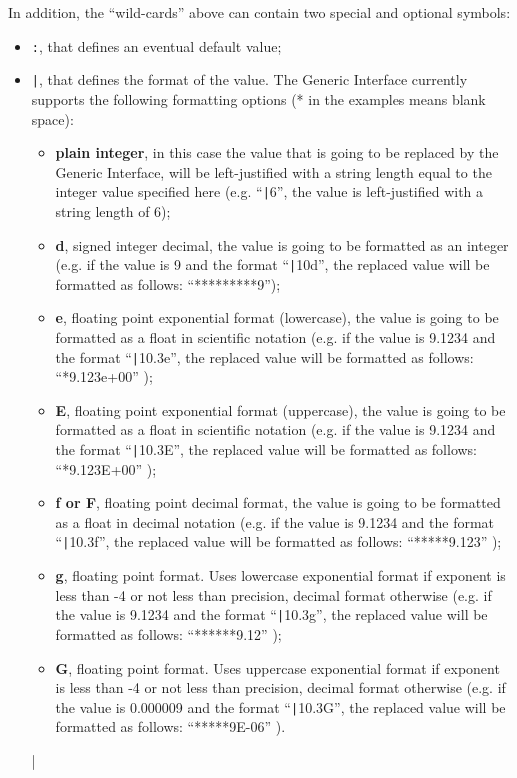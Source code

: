 In addition, the ``wild-cards'' above can contain two special and optional symbols:
\begin{itemize}
  \item  \texttt{:}, that defines an eventual default value;
  \item  \texttt{|}, that defines the format of the value. The  Generic Interface currently supports the following formatting options (* in the examples means blank space):
    \begin{itemize}
       \item \textbf{plain integer}, in this case  the value that is going to be replaced by the Generic Interface, will be left-justified with a string length equal to the integer value specified here (e.g. ``\texttt{|}6'', the value is left-justified with a string length of 6);
      \item \textbf{d}, signed integer decimal, the value is going to be formatted as an integer (e.g.  if the value is 9 and the format ``\texttt{|}10d'', the replaced value will be formatted as follows: ``*********9'');
      \item \textbf{e}, floating point exponential format (lowercase), the value is going to be formatted as a float in scientific notation (e.g. if the value is 9.1234 and the format ``\texttt{|}10.3e'', the replaced value will be formatted as follows: ``*9.123e+00'' );
      \item \textbf{E}, floating point exponential format (uppercase), the value is going to be formatted as a float in scientific notation (e.g. if the value is 9.1234 and the format ``\texttt{|}10.3E'', the replaced value will be formatted as follows: ``*9.123E+00'' );
      \item \textbf{f or F}, floating point decimal format, the value is going to be formatted as a float in decimal notation (e.g. if the value is 9.1234 and the format ``\texttt{|}10.3f'', the replaced value will be formatted as follows: ``*****9.123'' );
      \item \textbf{g}, floating point format. Uses lowercase exponential format if exponent is less than -4 or not less than precision, decimal format otherwise (e.g. if the value is 9.1234 and the format ``\texttt{|}10.3g'', the replaced value will be formatted as follows: ``******9.12'' );
      \item \textbf{G}, floating point format. Uses uppercase exponential format if exponent is less than -4 or not less than precision, decimal format otherwise (e.g. if the value is 0.000009 and the format ``\texttt{|}10.3G'', the replaced value will be formatted as follows: ``*****9E-06'' ).
    \end{itemize}|
\end{itemize}
